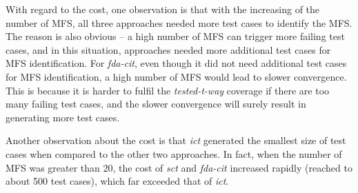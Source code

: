 \documentclass[10pt,journal,compsoc]{IEEEtran}
\begin{document}
With regard to the cost, one observation is that with the increasing of the number of MFS, all three approaches needed more test cases to identify the MFS. The reason is also obvious -- a high number of MFS can trigger more failing test cases, and in this situation, approaches needed more additional test cases for MFS identification. For \emph{fda-cit}, even though it did not need additional test cases for MFS identification, a high number of MFS would lead to slower convergence. This is because it is harder to fulfil the \emph{tested-t-way} coverage if there are too many failing test cases, and the slower convergence will surely result in generating more test cases.


Another observation about the cost is that \emph{ict} generated the smallest size of test cases when compared to the other two approaches. In fact, when the number of MFS was greater than 20, the cost of \emph{sct} and \emph{fda-cit} increased rapidly (reached to about 500 test cases), which far exceeded that of \emph{ict}.
\end{document}
